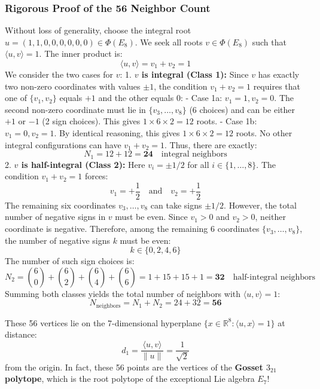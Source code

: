 \documentclass[11pt,twoside,openright]{amsbook}
\begin{document}
\subsubsection{Rigorous Proof of the 56 Neighbor Count}
Without loss of generality, choose the integral root $u = (1, 1, 0, 0, 0, 0, 0, 0) \in \Phi(E_8)$. We seek all roots $v \in \Phi(E_8)$ such that $\langle u, v \rangle = 1$.
The inner product is:
$$\langle u, v \rangle = v_1 + v_2 = 1$$
We consider the two cases for $v$:
1. \textbf{$v$ is integral (Class 1):}
   Since $v$ has exactly two non-zero coordinates with values $\pm 1$, the condition $v_1 + v_2 = 1$ requires that one of $\{v_1, v_2\}$ equals $+1$ and the other equals $0$:
   - Case 1a: $v_1 = 1, v_2 = 0$. The second non-zero coordinate must lie in $\{v_3, \dots, v_8\}$ (6 choices) and can be either $+1$ or $-1$ (2 sign choices). This gives $1 \times 6 \times 2 = 12$ roots.
   - Case 1b: $v_1 = 0, v_2 = 1$. By identical reasoning, this gives $1 \times 6 \times 2 = 12$ roots.
   No other integral configurations can have $v_1 + v_2 = 1$. Thus, there are exactly:
   $$N_{1} = 12 + 12 = \mathbf{24} \quad \text{integral neighbors}$$
2. \textbf{$v$ is half-integral (Class 2):}
   Here $v_i = \pm 1/2$ for all $i \in \{1, \dots, 8\}$. The condition $v_1 + v_2 = 1$ forces:
   $$v_1 = +\frac{1}{2} \quad \text{and} \quad v_2 = +\frac{1}{2}$$
   The remaining six coordinates $v_3, \dots, v_8$ can take signs $\pm 1/2$. However, the total number of negative signs in $v$ must be even.
   Since $v_1 > 0$ and $v_2 > 0$, neither coordinate is negative. Therefore, among the remaining 6 coordinates $\{v_3, \dots, v_8\}$, the number of negative signs $k$ must be even:
   $$k \in \{0, 2, 4, 6\}$$
   The number of such sign choices is:
   $$N_{2} = \binom{6}{0} + \binom{6}{2} + \binom{6}{4} + \binom{6}{6} = 1 + 15 + 15 + 1 = \mathbf{32} \quad \text{half-integral neighbors}$$
Summing both classes yields the total number of neighbors with $\langle u, v \rangle = 1$:
$$N_{\text{neighbors}} = N_1 + N_2 = 24 + 32 = \mathbf{56}$$

These 56 vertices lie on the 7-dimensional hyperplane $\{x \in \mathbb{R}^8 : \langle u, x \rangle = 1\}$ at distance:
$$d_1 = \frac{\langle u, v \rangle}{\|u\|} = \frac{1}{\sqrt{2}}$$
from the origin. In fact, these 56 points are the vertices of the \textbf{Gosset $3_{21}$ polytope}, which is the root polytope of the exceptional Lie algebra $E_7$!
\end{document}
